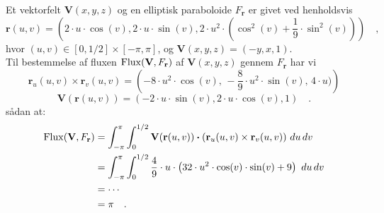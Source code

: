 \begin{example}\label{exampParabFlux}
Et vektorfelt $\mathbf{V}(x,y,z)$ og en elliptisk paraboloide $F_{\mathbf{r}}$ er givet ved henholdsvis
\begin{equation}
\mathbf{r}(u,v) = \left(2\cdot u\cdot \cos(v), 2\cdot u\cdot \sin(v), 2\cdot u^{2} \cdot (\cos^{2}(v) + \frac{1}{9}\cdot \sin^{2}(v)) \right) \quad ,
\end{equation}
hvor $(u,v) \in [0, 1/2] \times [-\pi, \pi]$, og $\mathbf{V}(x,y,z) = (-y, x, 1)$. \\

Til bestemmelse af fluxen $\operatorname{Flux}(\mathbf{V}, F_{\mathbf{r}})$ af $\mathbf{V}(x,y,z)$ gennem $F_{\mathbf{r}}$ har vi
\begin{equation}
\mathbf{r}_{u}(u,v) \times \mathbf{r}_{v}(u,v) = \left(-8\cdot u^{2} \cdot \cos(v), \, -\frac{8}{9}\cdot u^{2} \cdot \sin(v) , \, 4\cdot u)\right)
\end{equation}
\begin{equation}
\mathbf{V}(\mathbf{r}(u,v)) = (-2\cdot u \cdot \sin(v), 2\cdot u \cdot \cos(v), 1) \quad .
\end{equation}
sådan at:
\begin{equation}
\begin{aligned}
\operatorname{Flux}(\mathbf{V}, F_{\bf r}) &= \int_{-\pi}^{\pi} \int_{0}^{1/2} \mathbf{V}(\mathbf{r}(u,v)) \bm{\cdot} ( {\bf r}_{u}(u,v) \times {\bf r}_{v}(u,v)) \, \, du \, dv \\
&= \int_{-\pi}^{\pi} \int_{0}^{1/2} \frac{4}{9}\cdot u \cdot \left(32\cdot u^{2}\cdot \cos(v)\cdot \sin (v) + 9 \right)  \, \, du \, dv \\
&= \cdots \\
&= \pi \quad.
\end{aligned}
\end{equation}
\end{example}

